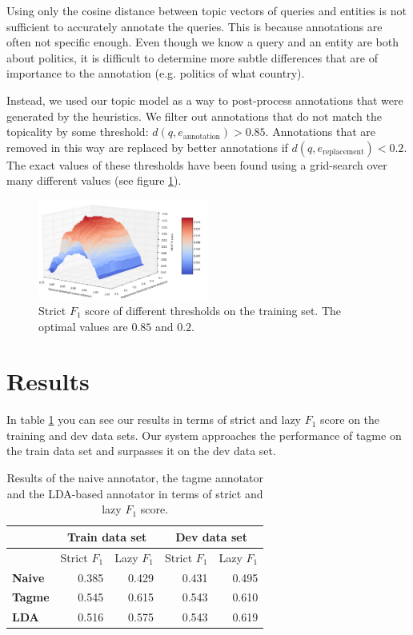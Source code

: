 \documentclass[a4paper,10pt,twocolumn]{article}
\begin{document}
Using only the cosine distance between topic vectors of queries and entities is not sufficient to accurately annotate the queries. This is because annotations are often not specific enough. Even though we know a query and an entity are both about politics, it is difficult to determine more subtle differences that are of importance to the annotation (e.g. politics of what country).

Instead, we used our topic model as a way to post-process annotations that were generated by the heuristics. We filter out annotations that do not match the topicality by some threshold: $d(q,e_\text{annotation}) > 0.85$. Annotations that are removed in this way are replaced by better annotations if $d(q,e_\text{replacement}) < 0.2$. The exact values of these thresholds have been found using a grid-search over many different values (see figure \ref{fig:gridsearch}).

\begin{figure}[H]
\centering
\includegraphics[width=0.5\textwidth]{gridsearch.png}
\caption{Strict $F_1$ score of different thresholds on the training set. The optimal values are $0.85$ and $0.2$.}
\label{fig:gridsearch}
\end{figure}

\section{Results}
In table \ref{tbl:results} you can see our results in terms of strict and lazy $F_1$ score on the training and dev data sets. Our system approaches the performance of tagme on the train data set and surpasses it on the dev data set.



\begin{table}[H]
\centering
\begin{tabular}{|l|r|r|r|r|}
\hline
 &  \multicolumn{2}{c|}{\textbf{Train data set}} & \multicolumn{2}{c|}{\textbf{Dev data set}} \\
\hline
 & Strict $F_1$ & Lazy $F_1$ & Strict $F_1$ & Lazy $F_1$ \\
\hline
\textbf{Naive} & 0.385 & 0.429 & 0.431 & 0.495 \\
\textbf{Tagme} & 0.545 & 0.615 & 0.543 & 0.610 \\
\textbf{LDA} & 0.516 & 0.575 & 0.543 & 0.619 \\
\hline
\end{tabular}
\caption{Results of the naive annotator, the tagme annotator and the LDA-based annotator in terms of strict and lazy $F_1$ score.}
\label{tbl:results}
\end{table}
\end{document}
